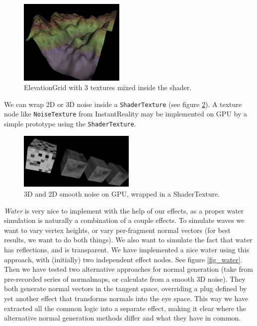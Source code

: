 \documentclass{egpubl}
\begin{document}
\begin{figure}[H]
  \centering
  \includegraphics[width=2in]{terrain}
  \caption{ElevationGrid with 3 textures mixed inside the shader.}
  \label{fig_terrain}
\end{figure}

We can wrap 2D or 3D noise inside a \texttt{ShaderTexture}
(see figure \ref{fig_noise}).
A texture node like \texttt{NoiseTexture} from InstantReality
\cite{instant:noisetex}
may be implemented on GPU by a simple prototype using the \texttt{ShaderTexture}.

\begin{figure}[H]
  \centering
  \includegraphics[width=2.2in]{noise-cropped}
  \caption{3D and 2D smooth noise on GPU, wrapped in a ShaderTexture.}
  \label{fig_noise}
\end{figure}

\emph{Water} is very nice to implement with the help of our effects,
as a proper water simulation
is naturally a combination of a couple effects.
To simulate waves we want to vary vertex
heights, or vary per-fragment normal vectors (for best results,
we want to do both things).
We also want to simulate the fact that water has reflections, and
is transparent. We have implemented a nice water using this approach,
with (initially) two independent effect nodes. See figure \ref{fig_water}.
Then we have tested two alternative
approaches for normal generation (take from pre-recorded series of normalmaps,
or calculate from a smooth 3D noise). They both generate normal
vectors in the tangent space, overriding a plug defined by yet another effect
that transforms normals into the eye space.
This way we have extracted all the common logic into a separate effect,
making it clear where the alternative normal generation methods differ
and what they have in common.
\end{document}
